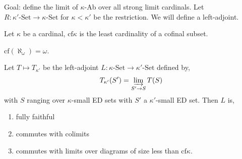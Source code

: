 \documentclass[12pt]{article}
\newcommand{\cf}{\mathrm{cf}}
\begin{document}
Goal: define the limit of $\kappa$-Ab over all strong limit cardinals. Let $R : \kappa'\text{-Set} \to \kappa\text{-Set}$ for $\kappa < \kappa'$ be the restriction. We will define a left-adjoint.

\begin{defn}
Let $\kappa$ be a cardinal, $\cf{\kappa}$ is the least cardinality of a cofinal subset.
\end{defn}

\begin{example}
$\cf(\aleph_\omega) = \omega$.
\end{example}

\begin{prop}
Let $T \mapsto T_{\kappa'}$ be the left-adjoint $L : \kappa\text{-Set} \to \kappa'\text{-Set}$ defined by,
\[ T_{\kappa'}(S') = \operatorname*{\varinjlim}_{S' \to S} T(S) \]
with $S$ ranging over $\kappa$-small ED sets with $S'$ a $\kappa'$-small ED set. Then $L$ is,
\begin{enumerate}
\item fully faithful
\item commutes with colimits
\item commutes with limits over diagrams of size less than $\cf{\kappa}$.
\end{enumerate}
\end{prop}
\end{document}
